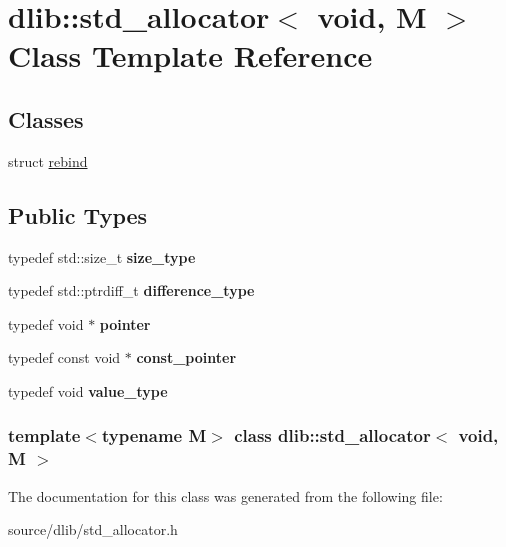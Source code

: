 \hypertarget{classdlib_1_1std__allocator_3_01void_00_01M_01_4}{
\section{dlib::std\_\-allocator$<$ void, M $>$ Class Template Reference}
\label{classdlib_1_1std__allocator_3_01void_00_01M_01_4}
}
\subsection*{Classes}
\begin{DoxyCompactItemize}
\item 
struct \hyperlink{structdlib_1_1std__allocator_3_01void_00_01M_01_4_1_1rebind}{rebind}
\end{DoxyCompactItemize}
\subsection*{Public Types}
\begin{DoxyCompactItemize}
\item 
\hypertarget{classdlib_1_1std__allocator_3_01void_00_01M_01_4_a88005f719e7a6e7c2b0037ea21eb1b83}{
typedef std::size\_\-t {\bfseries size\_\-type}}
\label{classdlib_1_1std__allocator_3_01void_00_01M_01_4_a88005f719e7a6e7c2b0037ea21eb1b83}

\item 
\hypertarget{classdlib_1_1std__allocator_3_01void_00_01M_01_4_a78c925ef5644177cc203408dae21824f}{
typedef std::ptrdiff\_\-t {\bfseries difference\_\-type}}
\label{classdlib_1_1std__allocator_3_01void_00_01M_01_4_a78c925ef5644177cc203408dae21824f}

\item 
\hypertarget{classdlib_1_1std__allocator_3_01void_00_01M_01_4_ad1ff4edf87526f06e78d79f5fc6155c6}{
typedef void $\ast$ {\bfseries pointer}}
\label{classdlib_1_1std__allocator_3_01void_00_01M_01_4_ad1ff4edf87526f06e78d79f5fc6155c6}

\item 
\hypertarget{classdlib_1_1std__allocator_3_01void_00_01M_01_4_af491101cb699e4b2d7bb2c5389182856}{
typedef const void $\ast$ {\bfseries const\_\-pointer}}
\label{classdlib_1_1std__allocator_3_01void_00_01M_01_4_af491101cb699e4b2d7bb2c5389182856}

\item 
\hypertarget{classdlib_1_1std__allocator_3_01void_00_01M_01_4_af4520fa945a67e28129c3c412481e3e5}{
typedef void {\bfseries value\_\-type}}
\label{classdlib_1_1std__allocator_3_01void_00_01M_01_4_af4520fa945a67e28129c3c412481e3e5}

\end{DoxyCompactItemize}
\subsubsection*{template$<$typename M$>$ class dlib::std\_\-allocator$<$ void, M $>$}



The documentation for this class was generated from the following file:\begin{DoxyCompactItemize}
\item 
source/dlib/std\_\-allocator.h\end{DoxyCompactItemize}
